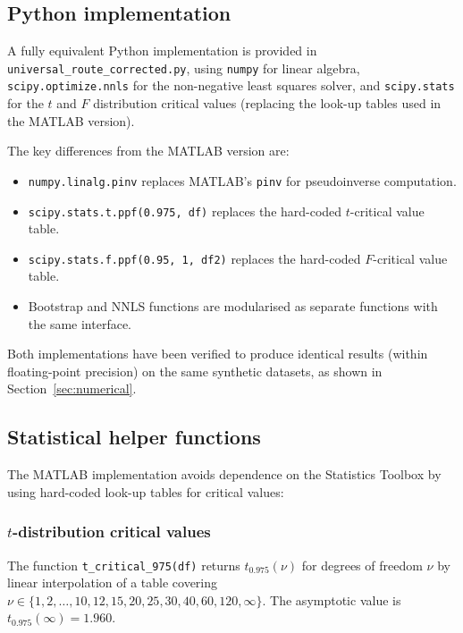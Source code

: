 \documentclass[12pt]{article}
\begin{document}
\subsection{Python implementation}

A fully equivalent Python implementation is provided in
\texttt{universal\_route\_corrected.py}, using \texttt{numpy} for
linear algebra, \texttt{scipy.optimize.nnls} for the non-negative
least squares solver, and \texttt{scipy.stats} for the $t$ and $F$
distribution critical values (replacing the look-up tables used in
the MATLAB version).

The key differences from the MATLAB version are:
\begin{itemize}[nosep]
  \item \texttt{numpy.linalg.pinv} replaces MATLAB's \texttt{pinv}
        for pseudoinverse computation.
  \item \texttt{scipy.stats.t.ppf(0.975, df)} replaces the
        hard-coded $t$-critical value table.
  \item \texttt{scipy.stats.f.ppf(0.95, 1, df2)} replaces the
        hard-coded $F$-critical value table.
  \item Bootstrap and NNLS functions are modularised as separate
        functions with the same interface.
\end{itemize}

Both implementations have been verified to produce identical results
(within floating-point precision) on the same synthetic datasets, as
shown in Section~\ref{sec:numerical}.

\subsection{Statistical helper functions}

The MATLAB implementation avoids dependence on the Statistics Toolbox
by using hard-coded look-up tables for critical values:

\subsubsection{$t$-distribution critical values}

The function \texttt{t\_critical\_975(df)} returns $t_{0.975}(\nu)$
for degrees of freedom $\nu$ by linear interpolation of a table
covering $\nu \in \{1, 2, \ldots, 10, 12, 15, 20, 25, 30, 40, 60,
120, \infty\}$.  The asymptotic value is $t_{0.975}(\infty) = 1.960$.
\end{document}

